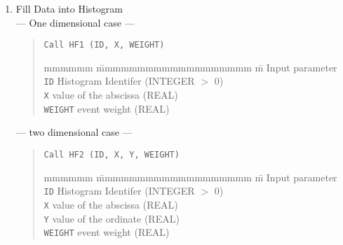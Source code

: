 \begin{enumerate}
\item Fill Data into Histogram \\
--- One dimensional case ---

\begin{quote}
\baselineskip 3.2mm\begin{verbatim}
Call HF1 (ID, X, WEIGHT)
\end{verbatim}
\begin{tabbing} mmmmmm \= mmmmmmmmmmmmmmmmmmm \= m \kill
Input parameter \\
{\tt ID}	\> Histogram Identifer		\> (INTEGER $>$ 0) \\
{\tt X}		\> value of the abscissa	\> (REAL) \\
{\tt WEIGHT}	\> event weight			\> (REAL)
\end {tabbing}
\end{quote}

--- two dimensional case ---

\begin{quote}
\baselineskip 3.2mm\begin{verbatim}
Call HF2 (ID, X, Y, WEIGHT)
\end{verbatim}
\begin{tabbing} mmmmmm \= mmmmmmmmmmmmmmmmmmm \= m \kill
Input parameter \\
{\tt ID}	\> Histogram Identifer		\> (INTEGER $>$ 0) \\
{\tt X}		\> value of the abscissa	\> (REAL) \\
{\tt Y}		\> value of the ordinate	\> (REAL) \\
{\tt WEIGHT}	\> event weight			\> (REAL)
\end {tabbing}
\end{quote}

\end{enumerate}


